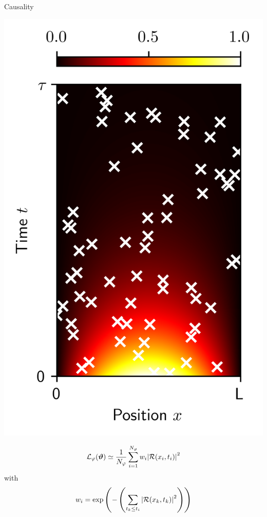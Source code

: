 \documentclass[aspectratio=169,compress,12pt,dvipsnames]{beamer}
\begin{document}
\begin{frame}{Causality}
  \vfill
  \begin{minipage}{.28\textwidth}
    \centering
    \includegraphics[width=\textwidth]{spatio_temporal_sampling.png}
  \end{minipage}%
  \hfill
  \begin{minipage}{.68\textwidth}
    \[
      \begin{aligned}
        \mathcal{L}_{\varphi}(\boldsymbol{\vartheta}) \simeq \dfrac{1}{N_{\varphi}} \sum_{i=1}^{N_{\varphi}} w_i \abs{ \mathcal{R}(x_i, t_i) }^2
      \end{aligned}
    \]
    with
    \[
      w_i = \exp \left( - \left( \sum_{t_k \leq t_i} \abs{\mathcal{R}(x_k, t_k) }^2 \right) \right)
    \]
  \end{minipage}
  \vfill
\end{frame}
\end{document}
